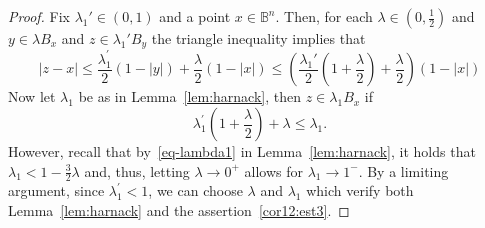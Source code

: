 \documentclass[10pt,a4paper]{amsart}
\newcommand{\B}{\mathbb{B}^n}
\begin{document}
\begin{proof}
 Fix $\lambda_1' \in (0,1)$ and a point $x\in \B$. Then, for each $\lambda \in (0, \frac12)$ and $y\in \lambda B_x$ and $z\in \lambda_1'B_y$ the triangle inequality implies that
$$
|z-x|\leq \frac{\lambda_1^\prime}{2}(1-|y|)+\frac{\lambda }{2}(1-|x|)\leq  \left(\frac{\lambda_1'}{2}(1+\frac{\lambda}{2}) +\frac{\lambda}{2}\right) (1-|x|)
$$
Now let $\lambda_1$ be as in Lemma~\ref{lem:harnack}, then $z\in\lambda_1 B_x$ if
$$
\lambda_1^\prime (1+\frac{\lambda}{2} )+\lambda \leq \lambda_1.
$$
However, recall that by~\eqref{eq-lambda1} in Lemma~\ref{lem:harnack}, it holds that $\lambda_1<1-\frac32 \lambda$ and, thus, letting $\lambda \rightarrow 0^+$ allows for $\lambda_1\rightarrow 1^-$. By a limiting argument, since $\lambda_1^\prime <1$, we can choose $\lambda$ and $\lambda_1$ which verify both Lemma~\ref{lem:harnack} and the assertion~\eqref{cor12:est3}.
\end{proof}
\end{document}
